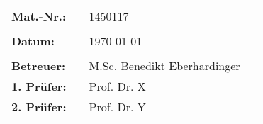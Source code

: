 \begin{center}
\begin{verbatim}



\end{verbatim}
\begin{tabular}{llll}
\textbf{Mat.-Nr.:} & & 1450117 & \\
& & \\
\textbf{Datum:} & & \today &\\
& & \\
\textbf{Betreuer:} & & M.Sc. Benedikt Eberhardinger &\\
\textbf{1. Prüfer:} & & Prof. Dr. X &\\
\textbf{2. Prüfer:} & & Prof. Dr. Y &\\
\end{tabular}
\end{center}